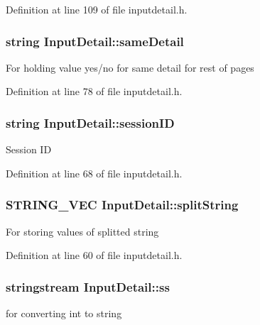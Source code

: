 \-Definition at line 109 of file inputdetail.\-h.

\hypertarget{classInputDetail_a13313d76b2ccc308634a7d802a46936a}{
\subsubsection[{same\-Detail}]{\setlength{\rightskip}{0pt plus 5cm}string {\bf \-Input\-Detail\-::same\-Detail}}}\label{db/d6e/classInputDetail_a13313d76b2ccc308634a7d802a46936a}
\-For holding value yes/no for same detail for rest of pages 

\-Definition at line 78 of file inputdetail.\-h.

\hypertarget{classInputDetail_a1f276e4df260009d465032ec64f3a543}{
\subsubsection[{session\-I\-D}]{\setlength{\rightskip}{0pt plus 5cm}string {\bf \-Input\-Detail\-::session\-I\-D}}}\label{db/d6e/classInputDetail_a1f276e4df260009d465032ec64f3a543}
\-Session \-I\-D 

\-Definition at line 68 of file inputdetail.\-h.

\hypertarget{classInputDetail_ab09ed4176090a72237531cedf00afb41}{
\subsubsection[{split\-String}]{\setlength{\rightskip}{0pt plus 5cm}\-S\-T\-R\-I\-N\-G\-\_\-\-V\-E\-C {\bf \-Input\-Detail\-::split\-String}}}\label{db/d6e/classInputDetail_ab09ed4176090a72237531cedf00afb41}
\-For storing values of splitted string 

\-Definition at line 60 of file inputdetail.\-h.

\hypertarget{classInputDetail_a5284736b5fd3db0251cfeab7c581c0bd}{
\subsubsection[{ss}]{\setlength{\rightskip}{0pt plus 5cm}stringstream {\bf \-Input\-Detail\-::ss}}}\label{db/d6e/classInputDetail_a5284736b5fd3db0251cfeab7c581c0bd}
for converting int to string 

